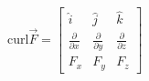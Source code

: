 \documentclass[preview]{standalone}
\begin{document}
\begin{center}
$ \text{curl}\vec{F} = \begin{bmatrix} \hat{i} & \hat{j} & \hat{k}\\ \frac{\partial}{\partial x} & \frac{\partial}{\partial y} & \frac{\partial}{\partial z}\\ F_{x} & F_{y} & F_{z} \end{bmatrix}$
\end{center}
\end{document}
